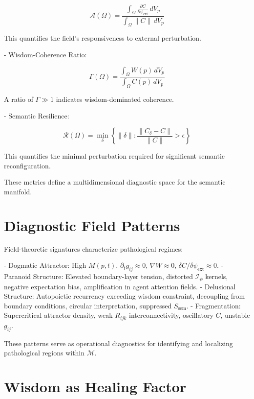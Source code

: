 \begin{equation}
\mathcal{A}(\Omega) = \frac{\int_{\Omega} \frac{\partial C}{\partial \psi_{\text{ext}}} \, dV_p}{\int_{\Omega} \|C\| \, dV_p}
\end{equation}

This quantifies the field's responsiveness to external perturbation.

- Wisdom-Coherence Ratio:

\begin{equation}
\Gamma(\Omega) = \frac{\int_{\Omega} W(p) \, dV_p}{\int_{\Omega} C(p) \, dV_p}
\end{equation}

A ratio of $\Gamma \gg 1$ indicates wisdom-dominated coherence.

- Semantic Resilience:

\begin{equation}
\mathcal{R}(\Omega) = \min_{\delta} \left\{\|\delta\| : \frac{\|C_{\delta} - C\|}{\|C\|} > \epsilon\right\}
\end{equation}

This quantifies the minimal perturbation required for significant semantic reconfiguration.

These metrics define a multidimensional diagnostic space for the semantic manifold.

\section{Diagnostic Field Patterns}

Field-theoretic signatures characterize pathological regimes:

- Dogmatic Attractor: High $M(p,t)$, $\partial_t g_{ij} \approx 0$, $\nabla W \approx 0$, $\delta C / \delta \psi_{\text{ext}} \approx 0$.
- Paranoid Structure: Elevated boundary-layer tension, distorted $\mathcal{I}_{\psi}$ kernels, negative expectation bias, amplification in agent attention fields.
- Delusional Structure: Autopoietic recurrency exceeding wisdom constraint, decoupling from boundary conditions, circular interpretation, suppressed $S_{\text{sem}}$.
- Fragmentation: Supercritical attractor density, weak $R_{ijk}$ interconnectivity, oscillatory $C$, unstable $g_{ij}$.

These patterns serve as operational diagnostics for identifying and localizing pathological regions within $\mathcal{M}$.

\section{Wisdom as Healing Factor}

